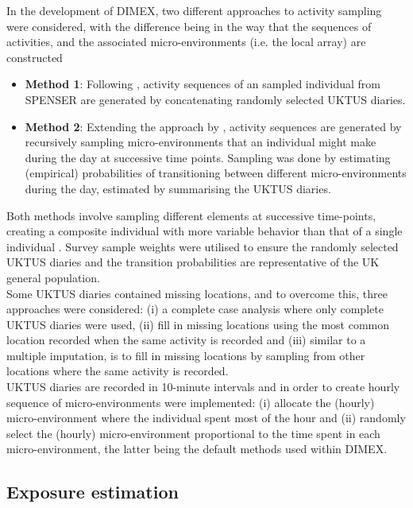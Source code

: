 \documentclass{article}
\begin{document}
\noindent In the development of DIMEX, two different approaches to activity sampling were considered, with the difference being in the way that the sequences of activities, and the associated micro-environments (i.e. the local array) are constructed
\begin{itemize}
    \item[] \textbf{Method 1}: Following \citep{zidek2007framework}, activity sequences of an sampled individual from SPENSER are generated by concatenating randomly selected UKTUS diaries.
    \item[] \textbf{Method 2}: Extending the approach by \citep{zidek2007framework}, activity sequences are generated by recursively sampling micro-environments that an individual might make during the day at successive time points. Sampling was done by estimating (empirical) probabilities of transitioning between different micro-environments during the day, estimated by summarising the UKTUS diaries.
\end{itemize}
Both methods involve sampling different elements at successive time-points, creating a composite individual with more variable behavior than that of a single individual \citep{zidek2007framework}. Survey sample weights were utilised to ensure the randomly selected UKTUS diaries and the transition probabilities are representative of the UK general population. \\

\noindent Some UKTUS diaries contained missing locations, and to overcome this, three approaches were considered: (i) a complete case analysis where only complete UKTUS diaries were used, (ii) fill in missing locations using the most common location recorded when the same activity is recorded and (iii) similar to a multiple imputation, is to fill in missing locations by sampling from other locations where the same activity is recorded. \\

\noindent UKTUS diaries are recorded in 10-minute intervals and in order to create hourly sequence of micro-environments were implemented: (i) allocate the (hourly) micro-environment where the individual spent most of the hour and (ii) randomly select the (hourly) micro-environment proportional to the time spent in each micro-environment, the latter being the default methods used within DIMEX.

\clearpage
\subsection{Exposure estimation}
\end{document}
